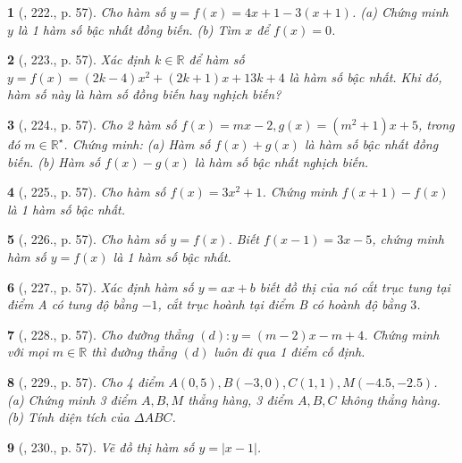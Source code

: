 \documentclass{article}
\newtheorem{baitoan}{}
\begin{document}
\begin{baitoan}[\cite{Tuyen_Toan_8}, 222., p. 57]
	Cho hàm số $y = f(x) = 4x + 1 - 3(x + 1)$. (a) Chứng minh $y$ là 1 hàm số bậc nhất đồng biến. (b) Tìm $x$ để $f(x) = 0$.
\end{baitoan}

\begin{baitoan}[\cite{Tuyen_Toan_8}, 223., p. 57]
	Xác định $k\in\mathbb{R}$ để hàm số $y = f(x) = (2k - 4)x^2 + (2k + 1)x + 13k + 4$ là hàm số bậc nhất. Khi đó, hàm số này là hàm số đồng biến hay nghịch biến?
\end{baitoan}

\begin{baitoan}[\cite{Tuyen_Toan_8}, 224., p. 57]
	Cho 2 hàm số $f(x) = mx - 2,g(x) = (m^2 + 1)x + 5$, trong đó $m\in\mathbb{R}^\star$. Chứng minh: (a) Hàm số $f(x) + g(x)$ là hàm số bậc nhất đồng biến. (b) Hàm số $f(x) - g(x)$ là hàm số bậc nhất nghịch biến.
\end{baitoan}

\begin{baitoan}[\cite{Tuyen_Toan_8}, 225., p. 57]
	Cho hàm số $f(x) = 3x^2 + 1$. Chứng minh $f(x + 1) - f(x)$ là 1 hàm số bậc nhất.
\end{baitoan}

\begin{baitoan}[\cite{Tuyen_Toan_8}, 226., p. 57]
	Cho hàm số $y = f(x)$. Biết $f(x - 1) = 3x - 5$, chứng minh hàm số $y = f(x)$ là 1 hàm số bậc nhất.
\end{baitoan}

\begin{baitoan}[\cite{Tuyen_Toan_8}, 227., p. 57]
	Xác định hàm số $y = ax + b$ biết đồ thị của nó cắt trục tung tại điểm A có tung độ bằng $-1$, cắt trục hoành tại điểm B có hoành độ bằng $3$.
\end{baitoan}

\begin{baitoan}[\cite{Tuyen_Toan_8}, 228., p. 57]
	Cho đường thẳng $(d):y = (m - 2)x - m + 4$. Chứng minh với mọi $m\in\mathbb{R}$ thì đường thẳng $(d)$ luôn đi qua 1 điểm cố định.
\end{baitoan}

\begin{baitoan}[\cite{Tuyen_Toan_8}, 229., p. 57]
	Cho 4 điểm $A(0,5),B(-3,0),C(1,1),M(-4.5,-2.5)$. (a) Chứng minh 3 điểm $A,B,M$ thẳng hàng, 3 điểm $A,B,C$ không thẳng hàng. (b) Tính diện tích của $\Delta ABC$.
\end{baitoan}

\begin{baitoan}[\cite{Tuyen_Toan_8}, 230., p. 57]
	Vẽ đồ thị hàm số $y = |x - 1|$.
\end{baitoan}
\end{document}

